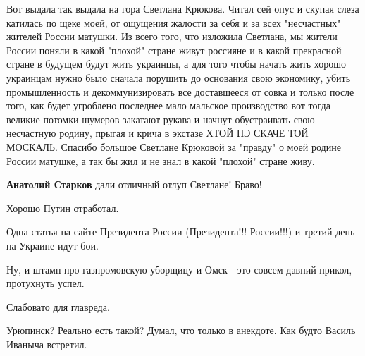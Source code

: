 \begin{itemize}
Вот выдала так выдала на гора Светлана Крюкова. Читал сей опус и скупая слеза
катилась по щеке моей, от ощущения жалости за себя и за всех "несчастных"
жителей России матушки. Из всего того, что изложила Светлана, мы жители России
поняли в какой "плохой" стране живут россияне и в какой прекрасной стране в
будущем будут жить украинцы, а для того чтобы начать жить хорошо украинцам
нужно было сначала порушить до основания свою экономику, убить промышленность и
декоммунизировать все доставшееся от совка и только после того, как будет
угроблено последнее мало мальское производство вот тогда великие потомки
шумеров закатают рукава и начнут обустраивать свою несчастную родину, прыгая и
крича в экстазе ХТОЙ НЭ СКАЧЕ ТОЙ МОСКАЛЬ. Спасибо большое Светлане Крюковой за
"правду" о моей родине России матушке, а так бы жил и не знал в какой "плохой"
стране живу.

\begin{itemize}
 
\textbf{Анатолий Старков} дали отличный отлуп Светлане! Браво!
\end{itemize}

 

Хорошо Путин отработал.

Одна статья на сайте Президента России (Президента!!! России!!!) и третий день на Украине идут бои.

Ну, и штамп про газпромовскую уборщицу и Омск - это совсем давний прикол, протухнуть успел.

Слабовато для главреда.

\begin{itemize}
 
Урюпинск? Реально есть такой? Думал, что только в анекдоте. Как будто Василь Иваныча встретил.

 

\end{itemize}
\end{itemize}
